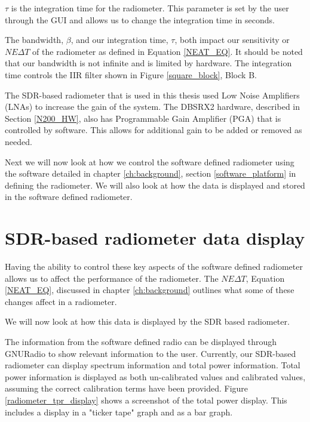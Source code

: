 $\tau$ is the integration time for the radiometer.  This parameter is set by the user through the GUI and allows us to change the integration time in seconds.

The bandwidth, $\beta$, and our integration time, $\tau$, both impact our sensitivity or $NE\Delta T$ of the radiometer as defined in Equation \ref{NEAT_EQ}.  It should be noted that our bandwidth is not infinite and is limited by hardware.  The integration time controls the IIR filter shown in Figure \ref{square_block}, Block B.  

The SDR-based radiometer that is used in this thesis used Low Noise Amplifiers (LNAs) to increase the gain of the system.  The DBSRX2 hardware, described in Section \ref{N200_HW}, also has Programmable Gain Amplifier (PGA) that is controlled by software.  This allows for additional gain to be added or removed as needed.



Next we will now look at how we control the software defined radiometer using the software detailed in chapter \ref{ch:background}, section \ref{software_platform} in defining the radiometer.  We will also look at how the data is displayed and stored in the software defined radiometer.

\section{SDR-based radiometer data display}


Having the ability to control these key aspects of the software defined radiometer allows us to affect the performance of the radiometer.  The $NE\Delta T$, Equation \ref{NEAT_EQ}, discussed in chapter \ref{ch:background} outlines what some of these changes affect in a radiometer.


We will now look at how this data is displayed by the SDR based radiometer.


The information from the software defined radio can be displayed through GNURadio to show relevant information to the user.  Currently, our SDR-based radiometer can display spectrum information and total power information.  Total power information is displayed as both un-calibrated values and calibrated values, assuming the correct calibration terms have been provided.  Figure \ref{radiometer_tpr_display} shows a screenshot of the total power display.  This includes a display in a "ticker tape" graph and as a bar graph.

